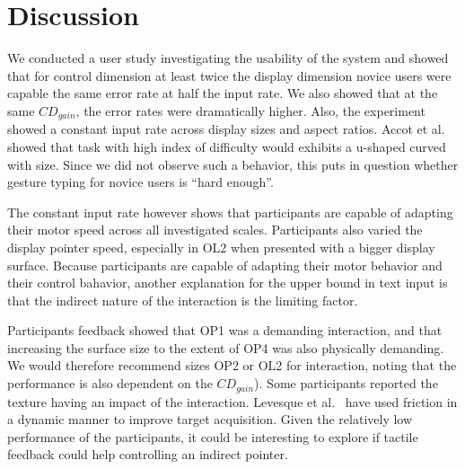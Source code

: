 \documentclass{chi-ext}
\newcommand{\cdt}[1]{{\small\uppercase{{#1}}}}
\begin{document}
\section{Discussion}


We conducted a user study investigating the usability of the system and showed that for control dimension at least twice the display dimension novice users were capable the same error rate at half the input rate. We also showed that at the same $CD_{gain}$, the error rates were dramatically higher. Also, the experiment showed a constant input rate across display sizes and aspect ratios. Accot et al.~\cite{Accot2001} showed that task with high index of difficulty would exhibits a u-shaped curved with size. Since we did not observe such a behavior, this puts in question whether gesture typing for novice users is “hard enough”.

The constant input rate however shows that participants are capable of adapting their motor speed across all investigated scales. Participants also varied the display pointer speed, especially in \cdt{OL2} when presented with a bigger display surface. Because participants are capable of adapting their motor behavior and their control bahavior, another explanation for the upper bound in text input is that the indirect nature of the interaction is the limiting factor.

Participants feedback showed that \cdt{OP1} was a demanding interaction, and that increasing the surface size to the extent of \cdt{OP4} was also physically demanding. We would therefore recommend sizes \cdt{OP2} or \cdt{OL2} for interaction, noting that the performance is also dependent on the $CD_{gain}$). Some participants reported the texture having an impact of the interaction. Levesque et al.~\cite{Levesque2011} have used friction in a dynamic manner to improve target acquisition. Given the relatively low performance of the participants, it could be interesting to explore if tactile feedback could help controlling an indirect pointer.
\end{document}
